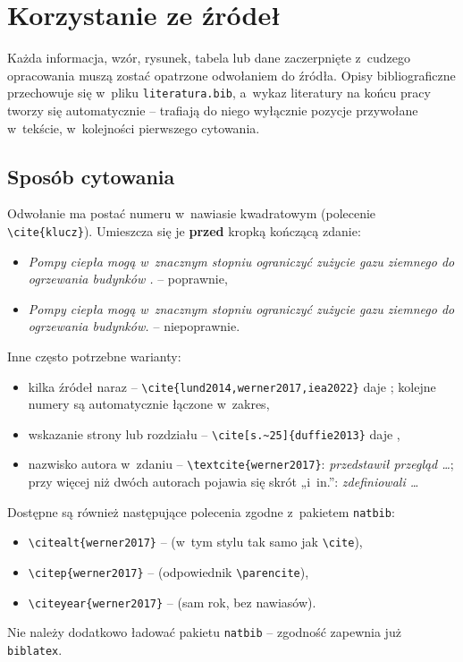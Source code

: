 \chapter{Korzystanie ze źródeł}
\label{chap:zrodla}

Każda informacja, wzór, rysunek, tabela lub dane zaczerpnięte z~cudzego
opracowania muszą zostać opatrzone odwołaniem do źródła. Opisy
bibliograficzne przechowuje się w~pliku \texttt{literatura.bib}, a~wykaz
literatury na końcu pracy tworzy się automatycznie -- trafiają do niego
wyłącznie pozycje przywołane w~tekście, w~kolejności pierwszego cytowania.

\section{Sposób cytowania}
\label{sec:cytowanie}

Odwołanie ma postać numeru w~nawiasie kwadratowym (polecenie
\verb|\cite{klucz}|). Umieszcza się je \textbf{przed} kropką kończącą
zdanie:
\begin{itemize}
  \item \emph{Pompy ciepła mogą w~znacznym stopniu ograniczyć zużycie gazu
        ziemnego do ogrzewania budynków \cite{iea2022}.} -- poprawnie,
  \item \emph{Pompy ciepła mogą w~znacznym stopniu ograniczyć zużycie gazu
        ziemnego do ogrzewania budynków. \cite{iea2022}} -- niepoprawnie.
\end{itemize}

Inne często potrzebne warianty:
\begin{itemize}
  \item kilka źródeł naraz -- \verb|\cite{lund2014,werner2017,iea2022}|
        daje \cite{lund2014,werner2017,iea2022}; kolejne numery są
        automatycznie łączone w~zakres,
  \item wskazanie strony lub rozdziału -- \verb|\cite[s.~25]{duffie2013}|
        daje \cite[s.~25]{duffie2013},
  \item nazwisko autora w~zdaniu -- \verb|\textcite{werner2017}|:
        \emph{\textcite{werner2017} przedstawił przegląd \dots};
        przy więcej niż dwóch autorach pojawia się skrót „i~in.”:
        \emph{\textcite{lund2014} zdefiniowali \dots}
\end{itemize}

Dostępne są również następujące polecenia zgodne z~pakietem
\texttt{natbib}:
\begin{itemize}
  \item \verb|\citealt{werner2017}| -- \citealt{werner2017}
        (w~tym stylu tak samo jak \verb|\cite|),
  \item \verb|\citep{werner2017}| -- \citep{werner2017}
        (odpowiednik \verb|\parencite|),
  \item \verb|\citeyear{werner2017}| -- \citeyear{werner2017} (sam rok, bez nawiasów).
\end{itemize}
Nie należy dodatkowo ładować pakietu \texttt{natbib} -- zgodność zapewnia
już \texttt{biblatex}.

